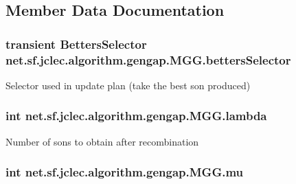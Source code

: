 \subsection{Member Data Documentation}
\hypertarget{classnet_1_1sf_1_1jclec_1_1algorithm_1_1gengap_1_1_m_g_g_ae74beac9d672b12e1c867a7f0e98d43b}{
\subsubsection[{betters\-Selector}]{\setlength{\rightskip}{0pt plus 5cm}transient {\bf Betters\-Selector} net.\-sf.\-jclec.\-algorithm.\-gengap.\-M\-G\-G.\-betters\-Selector\hspace{0.3cm}{\ttfamily [protected]}}}\label{classnet_1_1sf_1_1jclec_1_1algorithm_1_1gengap_1_1_m_g_g_ae74beac9d672b12e1c867a7f0e98d43b}
Selector used in update plan (take the best son produced) \hypertarget{classnet_1_1sf_1_1jclec_1_1algorithm_1_1gengap_1_1_m_g_g_a9ff16764aaa1eac1638b346e5e847725}{
\subsubsection[{lambda}]{\setlength{\rightskip}{0pt plus 5cm}int net.\-sf.\-jclec.\-algorithm.\-gengap.\-M\-G\-G.\-lambda\hspace{0.3cm}{\ttfamily [protected]}}}\label{classnet_1_1sf_1_1jclec_1_1algorithm_1_1gengap_1_1_m_g_g_a9ff16764aaa1eac1638b346e5e847725}
Number of sons to obtain after recombination \hypertarget{classnet_1_1sf_1_1jclec_1_1algorithm_1_1gengap_1_1_m_g_g_a54d54ef80c76a0f17b073e6ccfa4dc59}{
\subsubsection[{mu}]{\setlength{\rightskip}{0pt plus 5cm}int net.\-sf.\-jclec.\-algorithm.\-gengap.\-M\-G\-G.\-mu\hspace{0.3cm}{\ttfamily [protected]}}}\label{classnet_1_1sf_1_1jclec_1_1algorithm_1_1gengap_1_1_m_g_g_a54d54ef80c76a0f17b073e6ccfa4dc59}
